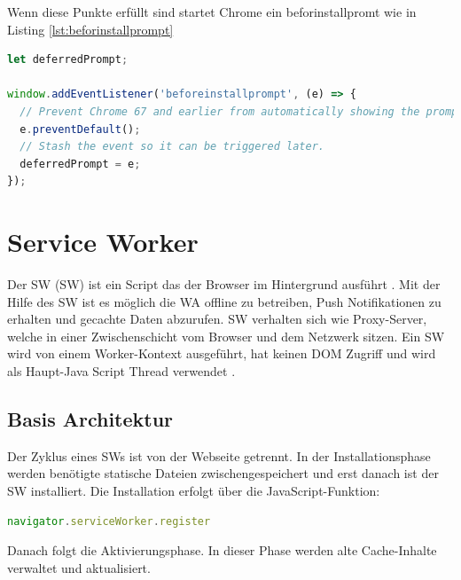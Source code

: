 \newpage
Wenn diese Punkte erfüllt sind startet Chrome ein beforinstallpromt wie in Listing \ref{lst:beforinstallprompt}


\begin{lstlisting}[language=JavaScript, caption={beforinstallprompt},label=lst:beforinstallprompt, xleftmargin=50pt]
let deferredPrompt;

window.addEventListener('beforeinstallprompt', (e) => {
  // Prevent Chrome 67 and earlier from automatically showing the prompt
  e.preventDefault();
  // Stash the event so it can be triggered later.
  deferredPrompt = e;
});
\end{lstlisting}


\newpage
\section{Service Worker}
Der \acl{SW} (\acs{SW}) ist ein Script das der Browser im Hintergrund ausführt \cite{ServiceWorkerRegistration}. Mit der Hilfe des \acs{SW} ist es möglich die \acs{WA} offline zu betreiben, Push Notifikationen zu erhalten und gecachte Daten abzurufen. \acs{SW} verhalten sich wie Proxy-Server, welche in einer Zwischenschicht vom Browser und dem Netzwerk sitzen. 
Ein \acs{SW} wird von einem Worker-Kontext \cite{Worker} ausgeführt, hat keinen DOM Zugriff und wird als Haupt-Java Script Thread verwendet \cite{ServiceWorker}.

\subsection{Basis Architektur}
Der Zyklus eines \acs{SW}s ist von der Webseite getrennt.
In der Installationsphase werden benötigte statische Dateien zwischengespeichert und erst danach ist der \acs{SW} installiert. Die Installation erfolgt über die JavaScript-Funktion:

\begin{lstlisting}[language=JavaScript, caption={Service Worker Navigator},label=lst:ServiceWorkerNavigator, xleftmargin=50pt]
navigator.serviceWorker.register
\end{lstlisting}

Danach folgt die Aktivierungsphase. In dieser Phase werden alte Cache-Inhalte verwaltet und aktualisiert.


